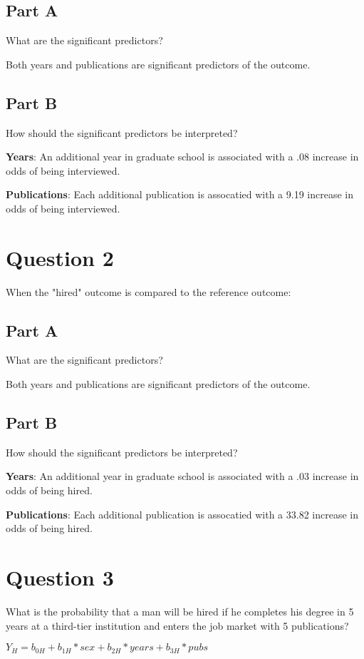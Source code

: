 \documentclass{article}\usepackage[]{graphicx}\usepackage[]{color}
\begin{document}
\subsection{Part A}
What are the significant predictors?

Both years and publications are significant predictors of the outcome. 

\subsection{Part B}
How should the significant predictors be interpreted?

\textbf{Years}: An additional year in graduate school is associated with a .08 increase in odds of being interviewed.

\textbf{Publications}: Each additional publication is assocatied with a 9.19 increase in odds of being interviewed.

\section{Question 2}
When the "hired" outcome is compared to the reference outcome: 

\subsection{Part A}
What are the significant predictors?

Both years and publications are significant predictors of the outcome. 

\subsection{Part B}
How should the significant predictors be interpreted?

\textbf{Years}: An additional year in graduate school is associated with a .03 increase in odds of being hired.

\textbf{Publications}: Each additional publication is assocatied with a 33.82 increase in odds of being hired.

\section{Question 3}
What is the probability that a man will be hired if he completes his degree in 5 years at a third-tier institution and enters the job market with 5 publications?

$Y_H = b_{0H} + b_{1H}*sex + b_{2H}*years + b_{3H}*pubs$
\end{document}
